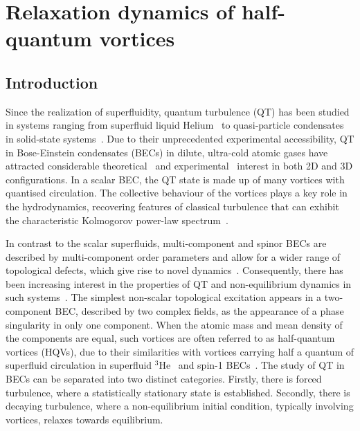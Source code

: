 \chapter{Relaxation dynamics of half-quantum vortices}

\section{Introduction}
Since the realization of superfluidity, quantum turbulence (QT) has been studied
in systems ranging from superfluid liquid
Helium~\cite{Barenghi2014, Walmsley2014} to quasi-particle
condensates in solid-state systems~\cite{Kreil2018}.
Due to their unprecedented experimental accessibility, QT in Bose-Einstein
condensates (BECs) in dilute, ultra-cold atomic gases have attracted
considerable theoretical~\cite{Kobayashi2007,Numasato2010, Reeves2013,
Billam2014,Simula2014,Baggaley2018} and
experimental~\cite{Henn2009,Kwon2014,Seo2017,Navon2019,Gauthier2019,
Johnstone2019} interest in both 2D and 3D configurations.
In a scalar BEC, the QT state is made up of many vortices with quantised
circulation.
The collective behaviour of the vortices plays a key role
in the hydrodynamics, recovering features of classical turbulence that can
exhibit the characteristic Kolmogorov power-law spectrum~\cite{Kobayashi2005}.


In contrast to the scalar superfluids, multi-component and spinor BECs are
described by multi-component order parameters and allow for a wider range of
topological defects, which give rise to novel dynamics~\cite{Kasamatsu2016,
Weiss2019,Kobayashi2009,Kasamatsu2005}.
Consequently, there has been increasing interest in the properties of QT and
non-equilibrium dynamics in such
systems~\cite{Salman2009, Schmied2019, Karl2013, Prufer2018, Hofmann2014}.
The simplest non-scalar topological excitation appears in a two-component BEC,
described by two complex fields, as the appearance of a phase singularity in
only one component. 
When the atomic mass and mean density of the components are equal, such vortices
are often referred to as half-quantum vortices (HQVs), due to their similarities
with vortices carrying half a quantum of superfluid circulation in superfluid
\(^3\)He~\cite{Autti2016} and spin-1 BECs~\cite{Leonhardt2000,Seo2015}.
The study of QT in BECs can be separated into two distinct categories.
Firstly, there is forced turbulence, where a statistically stationary state is
established.
Secondly, there is decaying turbulence, where a non-equilibrium initial
condition, typically involving vortices, relaxes towards equilibrium. 

